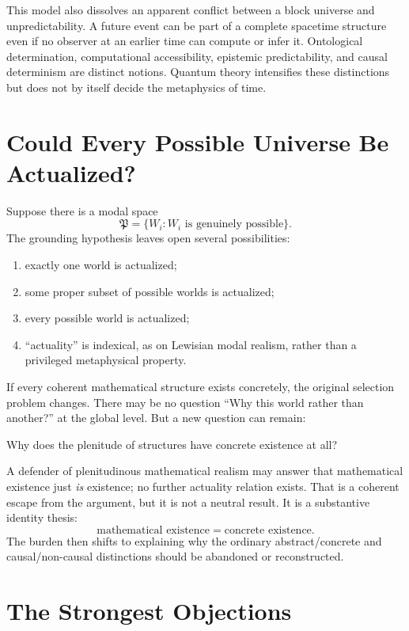 \documentclass[11pt,letterpaper]{article}
\theoremstyle{plain}
\theoremstyle{definition}
\begin{document}
This model also dissolves an apparent conflict between a block universe and unpredictability. A future event can be part of a complete spacetime structure even if no observer at an earlier time can compute or infer it. Ontological determination, computational accessibility, epistemic predictability, and causal determinism are distinct notions. Quantum theory intensifies these distinctions but does not by itself decide the metaphysics of time.

\section{Could Every Possible Universe Be Actualized?}

Suppose there is a modal space
\[
  \mathfrak{P} = \{W_i : W_i \text{ is genuinely possible}\}.
\]
The grounding hypothesis leaves open several possibilities:
\begin{enumerate}[label=(\alph*)]
  \item exactly one world is actualized;
  \item some proper subset of possible worlds is actualized;
  \item every possible world is actualized;
  \item ``actuality'' is indexical, as on Lewisian modal realism, rather than a privileged metaphysical property.
\end{enumerate}

If every coherent mathematical structure exists concretely, the original selection problem changes. There may be no question ``Why this world rather than another?'' at the global level. But a new question can remain:
\begin{center}
Why does the plenitude of structures have concrete existence at all?
\end{center}

A defender of plenitudinous mathematical realism may answer that mathematical existence just \emph{is} existence; no further actuality relation exists. That is a coherent escape from the argument, but it is not a neutral result. It is a substantive identity thesis:
\[
  \text{mathematical existence} = \text{concrete existence}.
\]
The burden then shifts to explaining why the ordinary abstract/concrete and causal/non-causal distinctions should be abandoned or reconstructed.

\section{The Strongest Objections}
\label{sec:objections}
\end{document}
